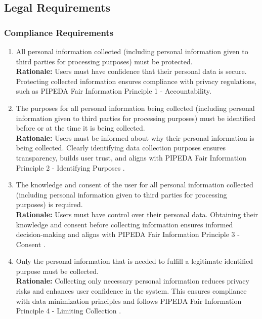 \documentclass[]{article}
\begin{document}

\subsection{Legal Requirements}
\label{sub:legal_requirements}

\subsubsection{Compliance Requirements}
\label{ssub:compliance_requirements}
\begin{enumerate}[{LR-COMP}1. ]
	\item All personal information collected (including personal information given to third parties for processing purposes) must be protected.
	\\ \textbf{Rationale:} Users must have confidence that their personal data is secure. Protecting collected information ensures compliance with privacy regulations, such as PIPEDA Fair Information Principle 1 - Accountability\cite{PIPEDA1}.
	\item The purposes for all personal information being collected (including personal information given to third parties for processing purposes) must be identified before or at the time it is being collected.
    \\ \textbf{Rationale:} Users must be informed about why their personal information is being collected. Clearly identifying data collection purposes ensures transparency, builds user trust, and aligns with PIPEDA Fair Information Principle 2 - Identifying Purposes \cite{PIPEDA2}.  

    \item The knowledge and consent of the user for all personal information collected (including personal information given to third parties for processing purposes) is required.
    \\ \textbf{Rationale:} Users must have control over their personal data. Obtaining their knowledge and consent before collecting information ensures informed decision-making and aligns with PIPEDA Fair Information Principle 3 - Consent \cite{PIPEDA3}.  

    \item Only the personal information that is needed to fulfill a legitimate identified purpose must be collected.
    \\ \textbf{Rationale:} Collecting only necessary personal information reduces privacy risks and enhances user confidence in the system. This ensures compliance with data minimization principles and follows PIPEDA Fair Information Principle 4 - Limiting Collection \cite{PIPEDA4}.  


\end{enumerate}
\end{document}

